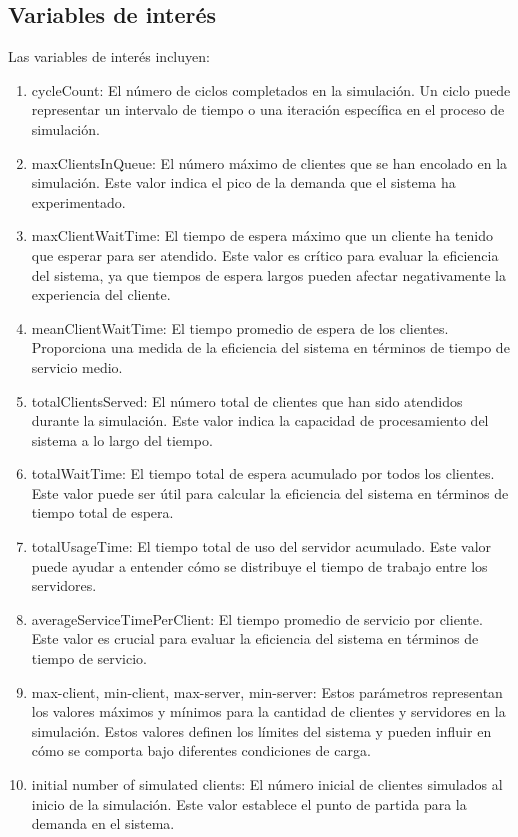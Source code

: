 \documentclass[12pt]{article}
\begin{document}
\subsection{Variables de interés}
Las variables de interés incluyen:
\begin{enumerate}

\item cycleCount: El número de ciclos completados en la simulación. Un ciclo puede representar un intervalo de tiempo o una iteración específica en el proceso de simulación.
\item maxClientsInQueue: El número máximo de clientes que se han encolado en la simulación. Este valor indica el pico de la demanda que el sistema ha experimentado.
\item maxClientWaitTime: El tiempo de espera máximo que un cliente ha tenido que esperar para ser atendido. Este valor es crítico para evaluar la eficiencia del sistema, ya que tiempos de espera largos pueden afectar negativamente la experiencia del cliente.
\item meanClientWaitTime: El tiempo promedio de espera de los clientes. Proporciona una medida de la eficiencia del sistema en términos de tiempo de servicio medio.
\item totalClientsServed: El número total de clientes que han sido atendidos durante la simulación. Este valor indica la capacidad de procesamiento del sistema a lo largo del tiempo.
\item totalWaitTime: El tiempo total de espera acumulado por todos los clientes. Este valor puede ser útil para calcular la eficiencia del sistema en términos de tiempo total de espera.
\item totalUsageTime: El tiempo total de uso del servidor acumulado. Este valor puede ayudar a entender cómo se distribuye el tiempo de trabajo entre los servidores.
\item averageServiceTimePerClient: El tiempo promedio de servicio por cliente. Este valor es crucial para evaluar la eficiencia del sistema en términos de tiempo de servicio.
\item max-client, min-client, max-server, min-server: Estos parámetros representan los valores máximos y mínimos para la cantidad de clientes y servidores en la simulación. Estos valores definen los límites del sistema y pueden influir en cómo se comporta bajo diferentes condiciones de carga.
\item initial number of simulated clients: El número inicial de clientes simulados al inicio de la simulación. Este valor establece el punto de partida para la demanda en el sistema.

\end{enumerate}
\end{document}
